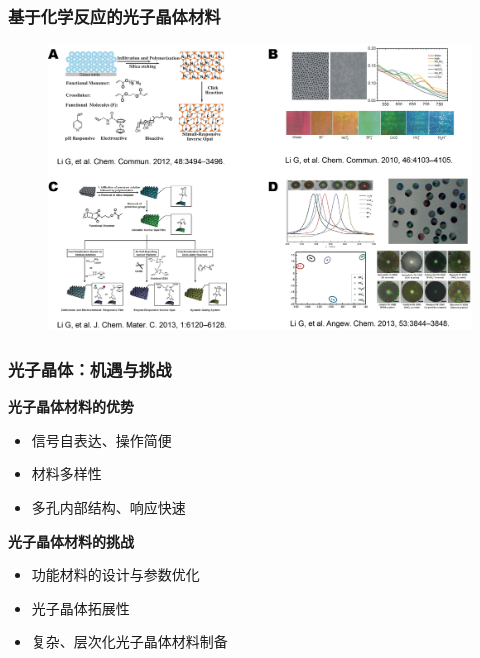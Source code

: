 \documentclass{beamer}
\begin{document}
\begin{frame}
  \frametitle{基于化学反应的光子晶体材料}
  \begin{figure}[htbp]
    \centering
    \includegraphics[width=0.90\linewidth]{figures/chem-react.png}
  \end{figure}
\end{frame}


\begin{frame}
  \frametitle{光子晶体：机遇与挑战}
  \pause
  \textcolor{tsinghua}{\textbf{光子晶体材料的优势}}
    \begin{itemize}
    \item
    信号自表达、操作简便
    \item
    材料多样性
    \item
    多孔内部结构、响应快速
  \end{itemize}
  \pause
  \textcolor{tsinghua}{\textbf{光子晶体材料的挑战}}
    \begin{itemize}
    \item
    功能材料的设计与参数优化
    \item
    光子晶体拓展性
    \item
    复杂、层次化光子晶体材料制备
  \end{itemize}
\end{frame}
\end{document}
